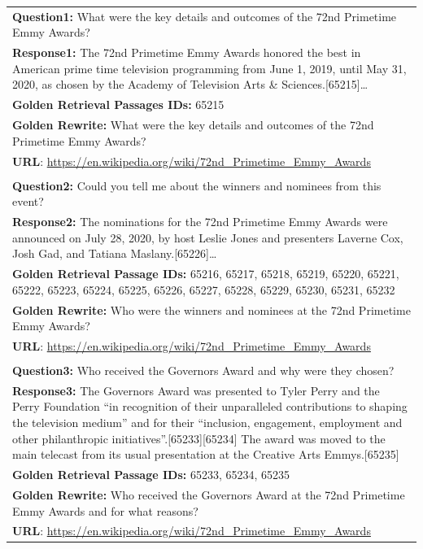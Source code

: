 \documentclass[11pt]{article}
\begin{document}
\clearpage
\begin{table}[http]
\centering
\begin{tabular}{p{14cm}}
\toprule
\textbf{Question1:} What were the key details and outcomes of the 72nd Primetime Emmy Awards?\\
\textbf{Response1:} The 72nd Primetime Emmy Awards honored the best in American prime time television programming from June 1, 2019, until May 31, 2020, as chosen by the Academy of Television Arts \& Sciences.[65215]\dots\\
\textbf{Golden Retrieval Passages IDs:} 65215\\
\textbf{Golden Rewrite:} What were the key details and outcomes of the 72nd Primetime Emmy Awards?\\
\textbf{URL}: \url{https://en.wikipedia.org/wiki/72nd_Primetime_Emmy_Awards}\\

\\

\textbf{Question2:} Could you tell me about the winners and nominees from this event?\\
\textbf{Response2:} The nominations for the 72nd Primetime Emmy Awards were announced on July 28, 2020, by host Leslie Jones and presenters Laverne Cox, Josh Gad, and Tatiana Maslany.[65226]\dots\\
\textbf{Golden Retrieval Passage IDs:} 65216, 65217, 65218, 65219, 65220, 65221, 65222, 65223, 65224, 65225, 65226, 65227, 65228, 65229, 65230, 65231, 65232\\
\textbf{Golden Rewrite:} Who were the winners and nominees at the 72nd Primetime Emmy Awards?\\
\textbf{URL}: \url{https://en.wikipedia.org/wiki/72nd_Primetime_Emmy_Awards}\\

\\



\textbf{Question3:} Who received the Governors Award and why were they chosen?\\
\textbf{Response3:} The Governors Award was presented to Tyler Perry and the Perry Foundation ``in recognition of their unparalleled contributions to shaping the television medium'' and for their ``inclusion, engagement, employment and other philanthropic initiatives''.[65233][65234]   The award was moved to the main telecast from its usual presentation at the Creative Arts Emmys.[65235]\\
\textbf{Golden Retrieval Passage IDs:} 65233, 65234, 65235\\
\textbf{Golden Rewrite:} Who received the Governors Award at the 72nd Primetime Emmy Awards and for what reasons?\\
\textbf{URL}: \url{https://en.wikipedia.org/wiki/72nd_Primetime_Emmy_Awards}\\


\end{tabular}
\end{table}
\end{document}
